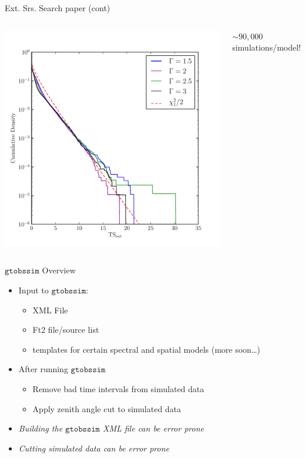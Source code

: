 \documentclass[12pt]{beamer}
\newcommand{\gtobssim}{\ensuremath{\mathtt{gtobssim}}\xspace}
\begin{document}
\begin{frame}{Ext. Srs. Search paper (cont)}
\begin{columns}
  \includegraphics[scale=0.45]{plots/ext_src_plot.pdf}

  $\sim90,000$ simulations/model!
\end{columns}
\end{frame}

\begin{frame}{\gtobssim Overview}
  \begin{itemize}
    \item Input to \gtobssim:
      \begin{itemize}
        \item XML File
        \item Ft2 file/source list
        \item templates for certain spectral and spatial models (more soon\dots)
      \end{itemize}
    \item After running \gtobssim
      \begin{itemize}
        \item Remove bad time intervals from simulated data
        \item Apply zenith angle cut to simulated data
      \end{itemize}
    \item \em{Building the \gtobssim XML file can be error prone}
    \item \em{Cutting simulated data can be error prone}
  \end{itemize}
\end{frame}
\end{document}
